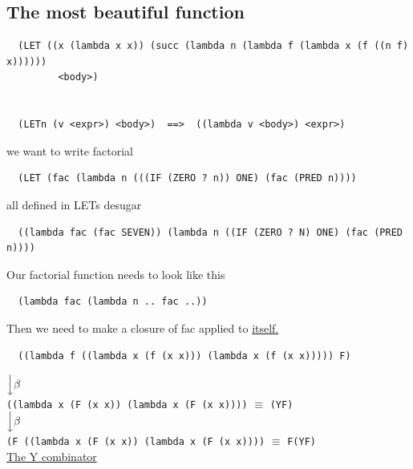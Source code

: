 \documentclass{article}
\begin{document}
\begin{flushleft}
\section*{The most beautiful function}
\begin{flushleft}
 \begin{verbatim}
  (LET ((x (lambda x x)) (succ (lambda n (lambda f (lambda x (f ((n f) x))))))
         <body>)
         
         
  (LETn (v <expr>) <body>)  ==>  ((lambda v <body>) <expr>)
 \end{verbatim}
 we want to write factorial\\
 \begin{verbatim}
  (LET (fac (lambda n (((IF (ZERO ? n)) ONE) (fac (PRED n))))
 \end{verbatim}
 all defined in LETs desugar
 \begin{verbatim}
  ((lambda fac (fac SEVEN)) (lambda n ((IF (ZERO ? N) ONE) (fac (PRED n))))
 \end{verbatim}
 Our factorial function needs to look like this
 \begin{verbatim}
  (lambda fac (lambda n .. fac ..))
 \end{verbatim}
 Then we need to make a closure of fac applied to \underline{itself.}
 \begin{verbatim}
  ((lambda f ((lambda x (f (x x))) (lambda x (f (x x))))) F)
 \end{verbatim}
 $\Big\downarrow{\beta}$\\
 \bigskip
 \verb|((lambda x (F (x x)) (lambda x (F (x x))))| $\equiv$ \verb|(YF)|\\
 \bigskip
 $\Big\downarrow{\beta}$\\
 \bigskip
 \verb|(F ((lambda x (F (x x)) (lambda x (F (x x))))| $\equiv$ \verb|F(YF)|\\
 \bigskip
 \underline{The Y combinator}
\end{flushleft}
\end{flushleft}
\bigskip
\end{document}
